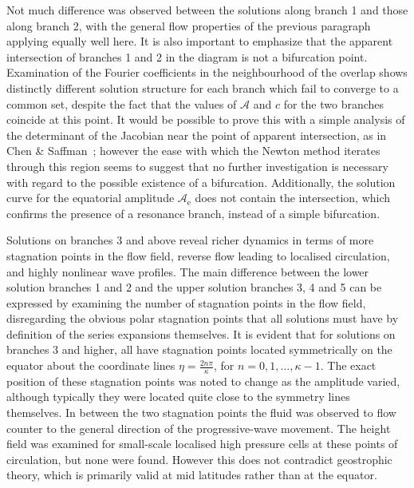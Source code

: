 Not much difference was observed between the solutions along branch 1 and those along branch 2, with the general flow properties of the previous paragraph applying equally well here. It is also important to emphasize that the apparent intersection of branches 1 and 2 in the diagram is not a bifurcation point. Examination of the Fourier coefficients in the neighbourhood of the overlap shows distinctly different solution structure for each branch which fail to converge to a common set, despite the fact that the values of $\mathcal{A}$ and $c$ for the two branches coincide at this point. It would be possible to prove this with a simple analysis of the determinant of the Jacobian near the point of apparent intersection, as in Chen \& Saffman~\cite{Chen:SGC}; however the ease with which the Newton method iterates through this region seems to suggest that no further investigation is necessary with regard to the possible existence of a bifurcation. Additionally, the solution curve for the equatorial amplitude $\mathcal{A}_{\text{e}}$ does not contain the intersection, which confirms the presence of a resonance branch, instead of a simple bifurcation.

Solutions on branches 3 and above reveal richer dynamics in terms of more stagnation points in the flow field, reverse flow leading to localised circulation, and highly nonlinear wave profiles. The main difference between the lower solution branches 1 and 2 and the upper solution branches 3, 4 and 5 can be expressed by examining the number of stagnation points in the flow field, disregarding the obvious polar stagnation points that all solutions must have by definition of the series expansions themselves. It is evident that for solutions on branches 3 and higher, all have stagnation points located symmetrically on the equator about the coordinate lines $\eta=\frac{2n\pi}{\kappa}$, for $n=0,1,\ldots,\kappa-1$. The exact position of these stagnation points was noted to change as the amplitude varied, although typically they were located quite close to the symmetry lines themselves. In between the two stagnation points the fluid was observed to flow counter to the general direction of the progressive-wave movement. The height field was examined for small-scale localised high pressure cells at these points of circulation, but none were found. However this does not contradict geostrophic theory, which is primarily valid at mid latitudes rather than at the equator.

